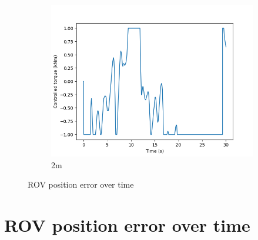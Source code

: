 \documentclass[class=article, crop=false]{standalone}
\begin{document}
\begin{figure}
\begin{subfigure}[b]{0.48\textwidth}
        \includegraphics{scenario1/rov-100m/2.0m/usv_torque}
        \caption{2m}
        \label{}
    \end{subfigure}

    \caption{ROV position error over time}
\end{figure}


\section{ROV position error over time}
\end{document}
